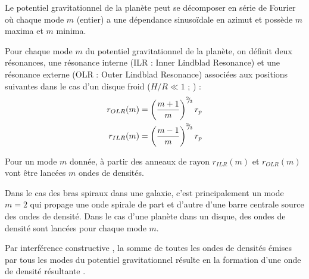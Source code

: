 

Le potentiel gravitationnel de la planète peut se décomposer en série de Fourier où chaque mode $m$ (entier) a une dépendance sinusoïdale en azimut et possède $m$ maxima et $m$ minima. 

Pour chaque mode $m$ du potentiel gravitationnel de la planète, on définit deux résonances, une résonance interne (ILR : Inner Lindblad Resonance) et une résonance externe (OLR : Outer Lindblad Resonance) associées aux positions suivantes dans le cas d'un disque froid ($H/R\ll 1$ ; \cite{ward1997protoplanet}) : 
\begin{subequations}
\begin{align}
r_{OLR}(m) &= \left(\frac{m+1}{m}\right)^{{}^{2\!\!}/ _{\!3}}r_p\\
r_{ILR}(m) &= \left(\frac{m-1}{m}\right)^{{}^{2\!\!}/ _{\!3}}r_p
\end{align}
\end{subequations}

Pour un mode $m$ donnée, à partir des anneaux de rayon $r_{ILR}(m)$ et $r_{OLR}(m)$ vont être lancées $m$ ondes de densités. 

Dans le cas des bras spiraux dans une galaxie, c'est principalement un mode $m=2$ qui propage une onde spirale de part et d'autre d'une barre centrale source des ondes de densité. Dans le cas d'une planète dans un disque, des ondes de densité sont lancées pour chaque mode $m$. 

Par interférence constructive \citep{ogilvie2002wake}, la somme de toutes les ondes de densités émises par tous les modes du potentiel gravitationnel résulte en la formation d'une onde de densité résultante . 

